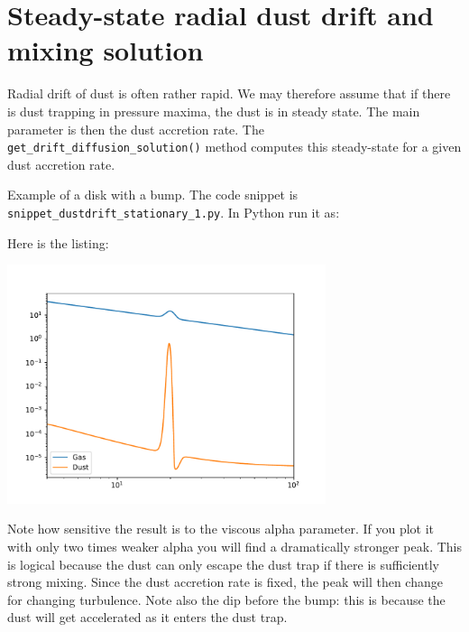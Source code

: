 \documentclass{book}
\newcommand{\code}[1]{{\small\tt #1}}
\begin{document}
\section{Steady-state radial dust drift and mixing solution}
\label{sec-dust-driftmix-steady}
Radial drift of dust is often rather rapid. We may therefore assume that
if there is dust trapping in pressure maxima, the dust is in steady state.
The main parameter is then the dust accretion rate.
The \code{get\_drift\_diffusion\_solution()} method computes this
steady-state for a given dust accretion rate.

Example of a disk with a bump. The code snippet is
\code{snippet\_dustdrift\_stationary\_1.py}. In Python run it as:
\begin{codebox}
\end{codebox}
Here is the listing:

\centerline{\includegraphics[width=0.7\textwidth]{../snippets/fig_snippet_dustdrift_stationary_1_1.pdf}}
Note how sensitive the result is to the viscous alpha parameter. If you plot it with
only two times weaker alpha you will find a dramatically stronger peak. This is logical
because the dust can only escape the dust trap if there is sufficiently strong mixing.
Since the dust accretion rate is fixed, the peak will then change for changing turbulence.
Note also the dip before the bump: this is because the dust will get accelerated as it
enters the dust trap.
\end{document}
